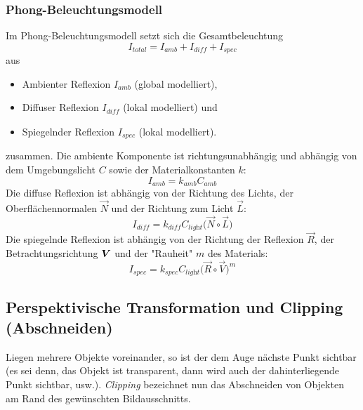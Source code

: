 			\subsubsection{Phong-Beleuchtungsmodell}
				Im Phong-Beleuchtungsmodell setzt sich die Gesamtbeleuchtung
				\begin{equation*}
					I_\textit{total} = I_\textit{amb} + I_\textit{diff} + I_\textit{spec}
				\end{equation*}
				aus
				\begin{itemize}
					\item Ambienter Reflexion \( I_\textit{amb} \) (global modelliert),
					\item Diffuser Reflexion \( I_\textit{diff} \) (lokal modelliert) und
					\item Spiegelnder Reflexion \( I_\textit{spec} \) (lokal modelliert).
				\end{itemize}
				zusammen. Die ambiente Komponente ist richtungsunabhängig und abhängig von dem Umgebungslicht \(C\) sowie der Materialkonstanten \(k\):
				\begin{equation*}
					I_\textit{amb} = k_\textit{amb} C_\textit{amb}
				\end{equation*}
				Die diffuse Reflexion ist abhängig von der Richtung des Lichts, der Oberflächennormalen \( \vec{N} \) und der Richtung zum Licht \( \vec{L} \):
				\begin{equation*}
					I_\textit{diff} = k_\textit{diff} C_\textit{light} \big( \vec{N} \circ \vec{L} \big)
				\end{equation*}
				Die spiegelnde Reflexion ist abhängig von der Richtung der Reflexion \( \vec{R} \), der Betrachtungsrichtung \( \bm{V} \) und der "Rauheit" \(m\) des Materials:
				\begin{equation*}
					I_\textit{spec} = k_\textit{spec} C_\textit{light} \big( \vec{R} \circ \vec{V} \big)^m
				\end{equation*}

		\subsection{Perspektivische Transformation und Clipping (Abschneiden)}
			Liegen mehrere Objekte voreinander, so ist der dem Auge nächste Punkt sichtbar (es sei denn, das Objekt ist transparent, dann wird auch der dahinterliegende Punkt sichtbar, usw.). \emph{Clipping} bezeichnet nun das Abschneiden von Objekten am Rand des gewünschten Bildausschnitts.

